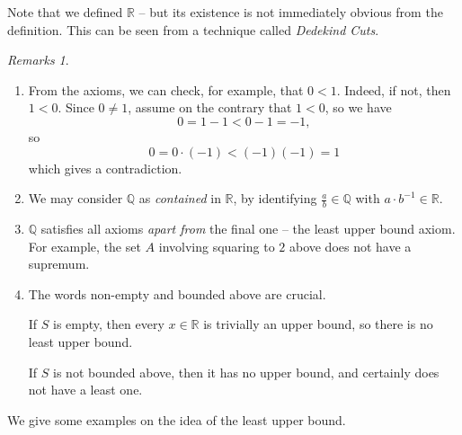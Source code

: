 \documentclass{article}
\theoremstyle{definition}
\theoremstyle{remark}
\newtheorem{remarks}[theorem]{Remarks}
\newcommand{\pqty}[1]{\left(#1\right)}
\newcommand{\inverse}{^{-1}}
\newcommand{\QQ}{\mathbb{Q}}
\newcommand{\RR}{\mathbb{R}}
\begin{document}
Note that we defined \(\RR\) -- but its existence is not immediately obvious from the definition. This can be seen from a technique called \emph{Dedekind Cuts}.

\begin{remarks}
    \begin{enumerate}
        \item From the axioms, we can check, for example, that \(0 < 1\). Indeed, if not, then \(1 < 0\). Since \(0 \neq 1\), assume on the contrary that \(1 < 0\), so we have
        \[
            0 = 1 - 1 < 0 - 1 = -1,
        \]
        so
        \[
            0 = 0 \cdot \pqty{-1} < \pqty{-1} \pqty{-1} = 1
        \]
        which gives a contradiction.
        \item We may consider \(\QQ\) as \emph{contained} in \(\RR\), by identifying \(\frac{a}{b} \in \QQ\) with \(a \cdot b\inverse \in \RR\).
        \item \(\QQ\) satisfies all axioms \emph{apart from} the final one -- the least upper bound axiom. For example, the set \(A\) involving squaring to \(2\) above does not have a supremum.
        \item The words non-empty and bounded above are crucial.
        
        If \(S\) is empty, then every \(x \in \RR\) is trivially an upper bound, so there is no least upper bound.

        If \(S\) is not bounded above, then it has no upper bound, and certainly does not have a least one.
    \end{enumerate}
\end{remarks}

We give some examples on the idea of the least upper bound.
\end{document}
